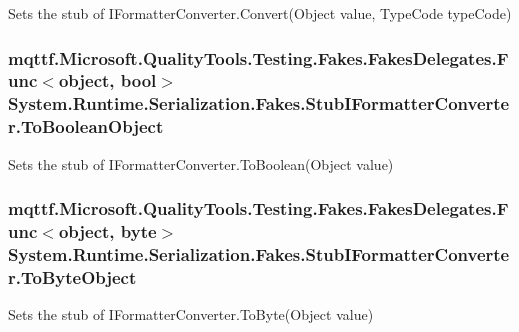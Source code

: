 Sets the stub of I\-Formatter\-Converter.\-Convert(\-Object value, Type\-Code type\-Code)

\hypertarget{class_system_1_1_runtime_1_1_serialization_1_1_fakes_1_1_stub_i_formatter_converter_a1f66e3554e4e708702fb3c0b9152741b}{
\subsubsection[{To\-Boolean\-Object}]{\setlength{\rightskip}{0pt plus 5cm}mqttf.\-Microsoft.\-Quality\-Tools.\-Testing.\-Fakes.\-Fakes\-Delegates.\-Func$<$object, bool$>$ System.\-Runtime.\-Serialization.\-Fakes.\-Stub\-I\-Formatter\-Converter.\-To\-Boolean\-Object}}\label{class_system_1_1_runtime_1_1_serialization_1_1_fakes_1_1_stub_i_formatter_converter_a1f66e3554e4e708702fb3c0b9152741b}


Sets the stub of I\-Formatter\-Converter.\-To\-Boolean(\-Object value)

\hypertarget{class_system_1_1_runtime_1_1_serialization_1_1_fakes_1_1_stub_i_formatter_converter_a7d5031cf6d118b3f4db4fd18e7ae8fa8}{
\subsubsection[{To\-Byte\-Object}]{\setlength{\rightskip}{0pt plus 5cm}mqttf.\-Microsoft.\-Quality\-Tools.\-Testing.\-Fakes.\-Fakes\-Delegates.\-Func$<$object, byte$>$ System.\-Runtime.\-Serialization.\-Fakes.\-Stub\-I\-Formatter\-Converter.\-To\-Byte\-Object}}\label{class_system_1_1_runtime_1_1_serialization_1_1_fakes_1_1_stub_i_formatter_converter_a7d5031cf6d118b3f4db4fd18e7ae8fa8}


Sets the stub of I\-Formatter\-Converter.\-To\-Byte(\-Object value)

